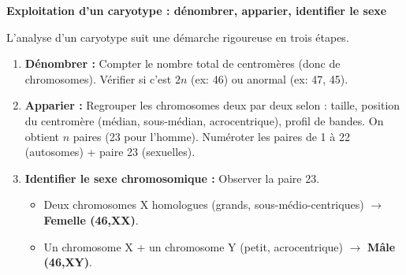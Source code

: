 \documentclass[11pt]{article}
\begin{document}
\textbf{Exploitation d'un caryotype : dénombrer, apparier, identifier le sexe}\par

L'analyse d'un caryotype suit une démarche rigoureuse en trois étapes.

\begin{methode}
\begin{enumerate}
    \item \textbf{Dénombrer :} Compter le nombre total de centromères (donc de chromosomes). Vérifier si c'est $2n$ (ex: 46) ou anormal (ex: 47, 45).
    \item \textbf{Apparier :} Regrouper les chromosomes deux par deux selon : taille, position du centromère (médian, sous-médian, acrocentrique), profil de bandes. On obtient $n$ paires (23 pour l'homme). Numéroter les paires de 1 à 22 (autosomes) + paire 23 (sexuelles).
    \item \textbf{Identifier le sexe chromosomique :} Observer la paire 23.
    \begin{itemize}
        \item Deux chromosomes X homologues (grands, sous-médio-centriques) $\rightarrow$ \textbf{Femelle (46,XX)}.
        \item Un chromosome X + un chromosome Y (petit, acrocentrique) $\rightarrow$ \textbf{Mâle (46,XY)}.
    \end{itemize}
\end{enumerate}
\end{methode}
\end{document}

